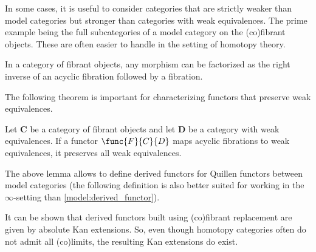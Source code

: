     In some cases, it is useful to consider categories that are strictly weaker than model categories but stronger than categories with weak equivalences. The prime example being the full subcategories of a model category on the (co)fibrant objects. These are often easier to handle in the setting of homotopy theory.

    \begin{theorem}
        In a category of fibrant objects, any morphism can be factorized as the right inverse of an acyclic fibration followed by a fibration.
    \end{theorem}

    The following theorem is important for characterizing functors that preserve weak equivalences.
    \begin{theorem}\label{model:ken_brown}
        Let $\mathbf{C}$ be a category of fibrant objects and let $\mathbf{D}$ be a category with weak equivalences. If a functor $\func{F}{C}{D}$ maps acyclic fibrations to weak equivalences, it preserves all weak equivalences.
    \end{theorem}

    The above lemma allows to define derived functors for Quillen functors between model categories (the following definition is also better suited for working in the $\infty$-setting than \cref{model:derived_functor}).
    \begin{property}\label{model:absolute_derived_functors}
        It can be shown that derived functors built using (co)fibrant replacement are given by absolute Kan extensions. So, even though homotopy categories often do not admit all (co)limits, the resulting Kan extensions do exist.
    \end{property}

